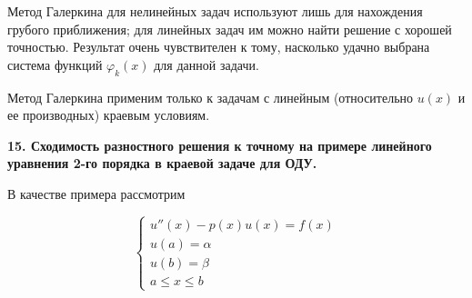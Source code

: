 \documentclass[a4paper,14pt]{article}
\begin{document}
\begin{figure}[!h]
	\label{fig:galerkin_pr2}
\end{figure}

Метод Галеркина для нелинейных задач используют лишь для 
нахождения грубого приближения; для линейных задач
им можно найти решение с хорошей точностью. Результат очень 
чувствителен к тому, насколько удачно выбрана система функций $\varphi_k(x)$
для данной задачи.

Метод Галеркина применим только к задачам с линейным (относительно
$u(x)$ и ее производных) краевым условиям.

\newpage
\textbf{15. Сходимость разностного решения к точному на примере линейного уравнения  2-го порядка в краевой задаче для ОДУ.}

В качестве примера рассмотрим 

\begin{equation}
	\begin{cases}
		u''(x) - p(x) u(x) = f(x) \\
		u(a) = \alpha \\
		u(b) = \beta \\
		a \leq x \leq b
	\end{cases}
\end{equation}
\end{document}
